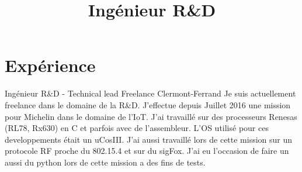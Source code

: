 \documentclass[11pt,a4paper,sans]{moderncv}
\title{Ing\'enieur R\&D}
\begin{document}
\makecvtitle

\section{Exp\'erience}

{Ing\'enieur R\&D - Technical lead}
{Freelance}
{Clermont-Ferrand}
{}
{Je suis actuellement freelance dans le domaine de la R\&D. J'effectue depuis
Juillet 2016 une mission pour Michelin dans le domaine de l'IoT. J'ai travaill\'e 
sur des processeurs Renesas (RL78, Rx630) en C et parfois avec de l'assembleur. 
L'OS utilis\'e pour ces developpements \'etait un uCosIII. J'ai aussi travaill\'e 
lors de cette mission sur un protocole RF proche du 802.15.4 et sur du sigFox. J'ai 
eu l'occasion de faire un aussi du python lors de cette mission a des fins de tests.}
\end{document}
